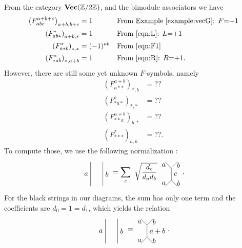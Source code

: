 From the category $\textbf{Vec}(\mathbb{Z}/2\mathbb{Z})$, and the bimodule associators we have
\begin{align}
\left(F_{abc}^{a+b+c}\right)_{a+b,b+c}&=1&&\text{From Example~\ref{example:vecG}: $F$=+1}\\
\left(F_{ab*}^*\right)_{a+b,*}&=1&&\text{From \eqref{eqn:L}: $L$=+1} \\
\left(F_{a*b}^*\right)_{*,*}&=(-1)^{ab}&&\text{From \eqref{eqn:F1}} \\
\left(F_{*ab}^*\right)_{*,a+b}&=1&&\text{From \eqref{eqn:R}: $R$=+1}.
\end{align}
\noindent
However, there are still some yet unknown $F$-symbols, namely
\begin{align}
	\left(F_{a**}^{a+b}\right)_{*,b}&=??\\
	\left(F_{*a*}^b\right)_{*,*}&=??\\
	\left(F_{**a}^{a+b}\right)_{b,*}&=??\\
	\left(F_{***}^*\right)_{a,b}&=??.
\end{align}
\noindent	
To compute those, we use the following normalization \cite{Bonderson,BSS08}:
	\begin{equation}
		\begin{tikzpicture}[scale=1.2,baseline=(current bounding box.center)]
			\draw (0,0) to node [left] {$a$} (0,1);
			\draw (0.5,0) to node [right] {$b$} (0.5,1);
		\end{tikzpicture}=\sum_c\ \sqrt{\frac{d_c}{d_a d_b}}\ 
		\begin{tikzpicture}[scale=1.2,baseline=(current bounding box.center)]
			\draw (0,0) to node [left] {$a$} (0.25,0.25);
			\draw (0.5,0) to node [right] {$b$} (0.25,0.25);
			\draw (0,1) to node [left] {$a$} (0.25,0.75);
			\draw (0.5,1) to node [right] {$b$} (0.25,0.75);
			\draw (0.25,0.25) to node [right] {$c$} (0.25,0.75);
		\end{tikzpicture}.
	\end{equation}
For the black strings in our diagrams, the sum has only one term and the coefficients are $d_0=1=d_1$, which yields the relation
	\begin{equation}
	\label{eq:completeness}
		\begin{tikzpicture}[scale=1.2,baseline=(current bounding box.center)]
			\draw (0,0) to node [left] {$a$} (0,1);
			\draw (0.5,0) to node [right] {$b$} (0.5,1);
		\end{tikzpicture}=
		\begin{tikzpicture}[scale=1.2,baseline=(current bounding box.center)]
			\draw (0,0) to node [left] {$a$} (0.25,0.25);
			\draw (0.5,0) to node [right] {$b$} (0.25,0.25);
			\draw (0,1) to node [left] {$a$} (0.25,0.75);
			\draw (0.5,1) to node [right] {$b$} (0.25,0.75);
			\draw (0.25,0.25) to node [right] {$a+b$} (0.25,0.75);
		\end{tikzpicture}.
	\end{equation}
